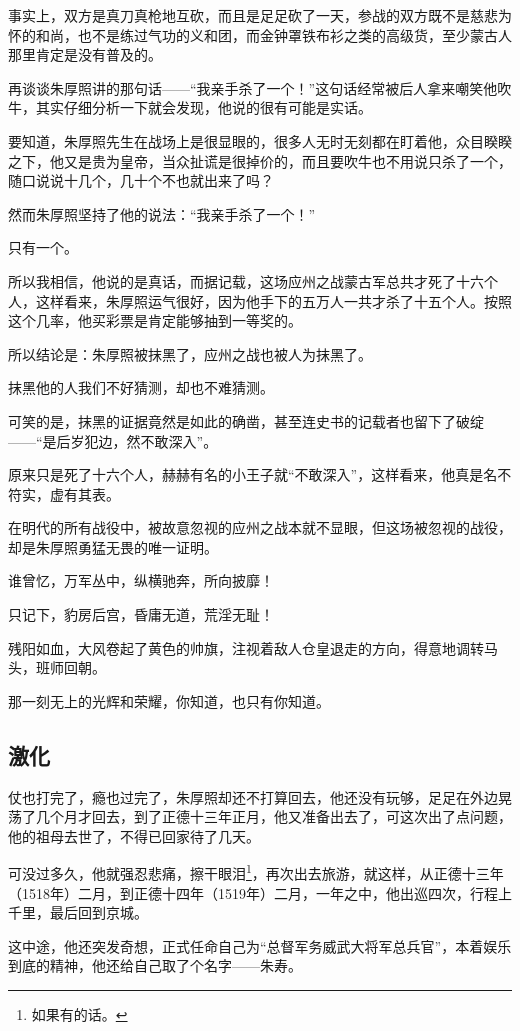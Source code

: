 \begin{multicols}{\theparacolNo}
		事实上，双方是真刀真枪地互砍，而且是足足砍了一天，参战的双方既不是慈悲为怀的和尚，也不是练过气功的义和团，而金钟罩铁布衫之类的高级货，至少蒙古人那里肯定是没有普及的。

		再谈谈朱厚照讲的那句话——“我亲手杀了一个！”这句话经常被后人拿来嘲笑他吹牛，其实仔细分析一下就会发现，他说的很有可能是实话。

		要知道，朱厚照先生在战场上是很显眼的，很多人无时无刻都在盯着他，众目睽睽之下，他又是贵为皇帝，当众扯谎是很掉价的，而且要吹牛也不用说只杀了一个，随口说说十几个，几十个不也就出来了吗？

		然而朱厚照坚持了他的说法：“我亲手杀了一个！”

		只有一个。

		所以我相信，他说的是真话，而据记载，这场应州之战蒙古军总共才死了十六个人，这样看来，朱厚照运气很好，因为他手下的五万人一共才杀了十五个人。按照这个几率，他买彩票是肯定能够抽到一等奖的。

		所以结论是：朱厚照被抹黑了，应州之战也被人为抹黑了。

		抹黑他的人我们不好猜测，却也不难猜测。

		可笑的是，抹黑的证据竟然是如此的确凿，甚至连史书的记载者也留下了破绽——“是后岁犯边，然不敢深入”。

		原来只是死了十六个人，赫赫有名的小王子就“不敢深入”，这样看来，他真是名不符实，虚有其表。

		在明代的所有战役中，被故意忽视的应州之战本就不显眼，但这场被忽视的战役，却是朱厚照勇猛无畏的唯一证明。

		谁曾忆，万军丛中，纵横驰奔，所向披靡！

		只记下，豹房后宫，昏庸无道，荒淫无耻！

		残阳如血，大风卷起了黄色的帅旗，注视着敌人仓皇退走的方向，得意地调转马头，班师回朝。

		那一刻无上的光辉和荣耀，你知道，也只有你知道。

		\subsection{激化}
		仗也打完了，瘾也过完了，朱厚照却还不打算回去，他还没有玩够，足足在外边晃荡了几个月才回去，到了正德十三年正月，他又准备出去了，可这次出了点问题，他的祖母去世了，不得已回家待了几天。

		可没过多久，他就强忍悲痛，擦干眼泪\footnote{如果有的话。}，再次出去旅游，就这样，从正德十三年（1518年）二月，到正德十四年（1519年）二月，一年之中，他出巡四次，行程上千里，最后回到京城。

		这中途，他还突发奇想，正式任命自己为“总督军务威武大将军总兵官”，本着娱乐到底的精神，他还给自己取了个名字——朱寿。


\end{multicols}
